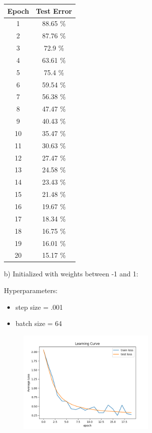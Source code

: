 \documentclass[a4paper]{article}
\theoremstyle{definition}
\newenvironment{soln}{
    \leavevmode\color{blue}\ignorespaces
}{}
\begin{document}
\begin{enumerate}
\begin{soln}
        \begin{center}
            \begin{tabular}{c | c}
                Epoch & Test Error \\ \hline
                1 & 88.65 \% \\
                2 & 87.76 \% \\
                3 & 72.9 \% \\
                4 & 63.61 \% \\
                5 & 75.4 \% \\
                6 & 59.54 \% \\
                7 & 56.38 \% \\
                8 & 47.47 \% \\
                9 & 40.43 \% \\
                10 & 35.47 \% \\
                11 & 30.63 \% \\
                12 & 27.47 \% \\
                13 & 24.58 \% \\
                14 & 23.43 \% \\
                15 & 21.48 \% \\
                16 & 19.67 \% \\
                17 & 18.34 \% \\
                18 & 16.75 \% \\
                19 & 16.01 \% \\
                20 & 15.17 \% \\
            \end{tabular}
        \end{center}

        b) Initialized with weights between -1 and 1:

        Hyperparameters:
        \begin{itemize}
            \item step size = .001
            \item batch size = 64
        \end{itemize}
        
        \begin{figure}[H]
			\centering
			\includegraphics[width=0.6\textwidth]{../figs/neg_one_one_learning_curve.png}
		\end{figure}
       

\end{soln}
\end{enumerate}
\end{document}
